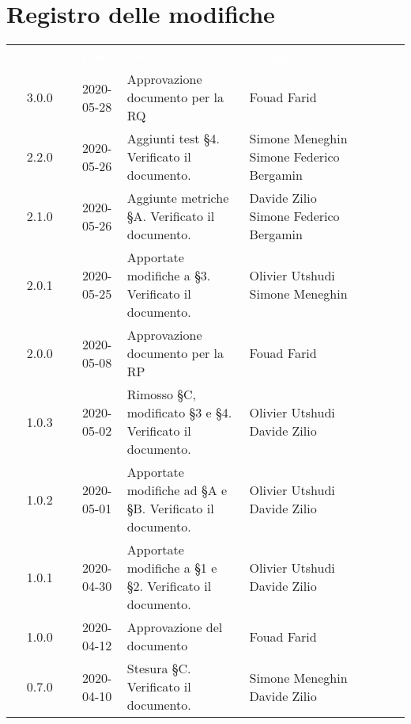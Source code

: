 \section*{Registro delle modifiche}
{
	\centering
	\begin{longtable}{ c c  C{4cm}  C{3.5cm}  C{3.5cm} }
		\textcolor{white}{\textbf{Versione}} & \textcolor{white}{\textbf{Data}} & \textcolor{white}{\textbf{Descrizione}} & \textcolor{white}{\textbf{Nominativo}} & \textcolor{white}{\textbf{Ruolo}}\\	
		3.0.0 & 2020-05-28 & Approvazione documento per la RQ & Fouad Farid &\RdP \\		
		2.2.0 & 2020-05-26 & Aggiunti test \S 4. Verificato il documento. & Simone Meneghin \newline Simone Federico Bergamin  & \prog \newline \ver{} \\
		2.1.0 & 2020-05-26 & Aggiunte metriche \S A. Verificato il documento. & Davide Zilio \newline Simone Federico Bergamin  & \prog \newline \ver{} \\
		2.0.1 & 2020-05-25 & Apportate modifiche a §3. Verificato il documento.& Olivier Utshudi \newline Simone Meneghin & \prog \newline \ver{} \\
		2.0.0 & 2020-05-08 & Approvazione documento per la RP & Fouad Farid &\RdP \\
		1.0.3 & 2020-05-02 & Rimosso §C, modificato \S 3 e \S 4. Verificato il documento. & Olivier Utshudi \newline Davide Zilio &\prog \newline \ver{}\\		
		1.0.2 & 2020-05-01 & Apportate modifiche ad §A e §B. Verificato il documento. & Olivier Utshudi \newline Davide Zilio &\prog \newline \ver{}\\
		1.0.1 & 2020-04-30 & Apportate modifiche a §1 e §2. Verificato il documento. & Olivier Utshudi \newline Davide Zilio &\prog \newline \ver{}\\
		1.0.0 & 2020-04-12 & Approvazione del documento & Fouad Farid &\RdP{} \\
		0.7.0 & 2020-04-10 & Stesura \S C. Verificato il documento. & Simone Meneghin \newline Davide Zilio &\prog{}\newline \ver{} \\

\end{longtable}}
